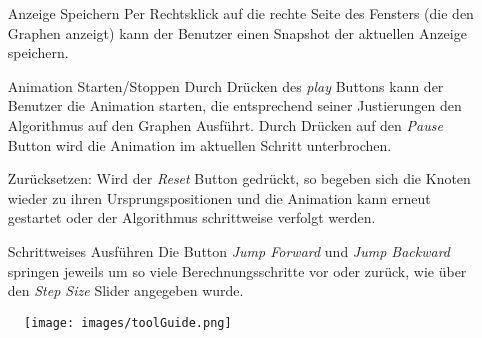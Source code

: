 \begin{enumerate}
    \item[Anzeige Speichern] Per Rechtsklick auf die rechte Seite des Fensters (die den Graphen anzeigt) kann der Benutzer einen Snapshot der aktuellen Anzeige speichern.
    
    \item [Animation Starten/Stoppen] Durch Drücken des \textit{play} Buttons kann der Benutzer die Animation starten, die entsprechend seiner Justierungen den Algorithmus auf den Graphen Ausführt. Durch Drücken auf den \textit{Pause} Button wird die Animation im aktuellen Schritt unterbrochen. 
    
    \item[Zurücksetzen:]Wird der \textit{Reset} Button gedrückt, so begeben sich die Knoten wieder zu ihren Ursprungspositionen und die Animation kann erneut gestartet oder der Algorithmus schrittweise verfolgt werden.
    
    \item[Schrittweises Ausführen] Die Button \textit{Jump Forward} und \textit{Jump Backward} springen jeweils um so viele Berechnungsschritte vor oder zurück, wie über den \textit{Step Size} Slider angegeben wurde.
    
    
\end{enumerate}


\begin{figure}[ht!]
    \centering
    \texttt{[image: images/toolGuide.png]}
\end{figure}
